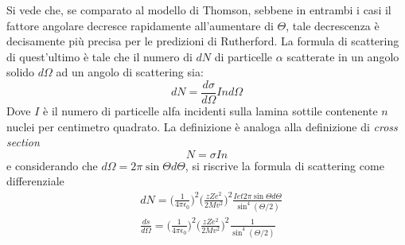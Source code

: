 Si vede che, se comparato al modello di Thomson, sebbene in entrambi i casi il fattore angolare decresce rapidamente all'aumentare di $\Theta$, tale decrescenza è decisamente più precisa per le predizioni di Rutherford.
La formula di scattering di quest'ultimo è tale che il numero di $dN$ di particelle $\alpha$ scatterate in un angolo solido $d \Omega$ ad un angolo di scattering sia:
\begin{equation}
dN =  \frac{ d\sigma }{d\Omega} I n d\Omega
\end{equation}
Dove $I$ è il numero di particelle alfa incidenti sulla lamina sottile contenente $n$ nuclei per centimetro quadrato.
La definizione è analoga alla definizione di \textit{cross section}
\begin{equation}
N = \sigma I n
\end{equation}
e considerando che $d\Omega = 2\pi\sin\Theta d\Theta$, si riscrive la formula di scattering come differenziale
\begin{equation}
\begin{split}
& dN =  \biggl( \frac{1}{4\pi \epsilon_0} \biggr) ^2  \biggl( \frac{z Z e^2}{2 M v^2} \biggr)^2  \frac{ I e t 2 \pi \sin\Theta d\Theta }{ \sin^4(\Theta/2) } \\
& \frac{ds}{d\Omega} = \biggl( \frac{1}{4 \pi \epsilon_0} \biggr)^2  \biggl( \frac{z Z e^2}{2 M v^2} \biggr)^2  \frac{ 1 }{ \sin^4(\Theta/2) }
\end{split}
\end{equation}




